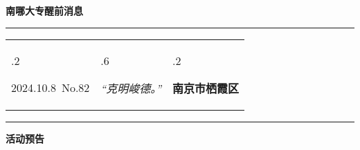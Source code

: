 \documentclass[letterpaper, 12pt]{article}
\begin{document}
\begin{center}
    \Huge\textbf{南哪大专醒前消息}
\end{center}
\vspace{4mm}
\hrule
\renewcommand\tabularxcolumn[1]{m{#1}}
\begin{tabularx}{\textwidth}{>{\hsize.2\hsize}X>{\hsize.6\hsize}X>{\hsize.2\hsize}X}
    \begin{flushleft}
        2024.10.8\, No.82
    \end{flushleft}
    &
    \begin{center}
        \textit{“克明峻德。”}
    \end{center}
    &
    \begin{flushright}
        \textbf{南京市栖霞区}
    \end{flushright}
\end{tabularx}
\vspace{-3.5mm}
\hrule
\vspace{4mm}
\centerline{\huge\textbf{活动预告}}
\end{document}
